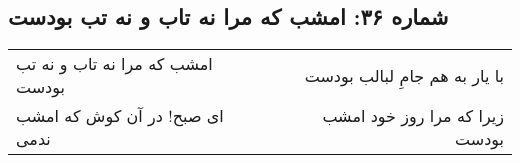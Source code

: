 \begin{center}
\section*{شماره ۳۶: امشب که مرا نه تاب و نه تب بودست}
\label{sec:036}
\begin{longtable}{l p{0.5cm} r}
امشب که مرا نه تاب و نه تب بودست
&&
با یار به هم جامِ لبالب بودست
\\
ای صبح! در آن کوش که امشب ندمی
&&
زیرا که مرا روز خود امشب بودست
\\
\end{longtable}
\end{center}
